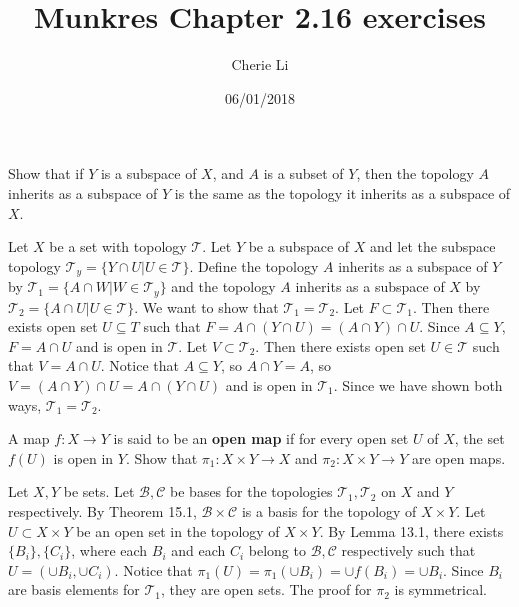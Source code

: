 \documentclass[12pt]{article}
\title{Munkres Chapter 2.16 exercises}
\author{Cherie Li}
\date{06/01/2018}
\newenvironment{problem}[2][Problem]
{
	\begin{trivlist} 
		\item[\hskip \labelsep {\bfseries #1 #2:}]
	}
{
	\end{trivlist}
	}
\newenvironment{solution}[1][Solution]
{
	\begin{trivlist} 
		\item[\hskip \labelsep {\itshape #1:}]
	}
	{
	\end{trivlist}
}
\begin{document}
\maketitle
\newpage
%
%
%
%
\begin{problem}[Exercise]{2.16.1}	
	Show that if $Y$ is a subspace of $X$, and $A$ is a subset of $Y$, then the topology $A$ inherits as a subspace of $Y$ is the same as the topology it inherits as a subspace of $X$. 
\end{problem}
\begin{solution} 
	Let $X$ be a set with topology $\mathcal{T}$. Let $Y$ be a subspace of $X$ and let the subspace topology $\mathcal{T}_y = \lbrace{Y \cap U | U \in \mathcal{T}\rbrace}$. Define the topology $A$ inherits as a subspace of $Y$ by $\mathcal{T}_1 = \lbrace{A \cap W | W \in \mathcal{T}_y\rbrace}$ and the topology $A$ inherits as a subspace of $X$ by $\mathcal{T}_2 = \lbrace{A \cap U | U \in \mathcal{T}\rbrace}$. We want to show that $\mathcal{T}_1 = \mathcal{T}_2$. Let $F \subset \mathcal{T}_1$. Then there exists open set $U \subseteq T$ such that $F = A \cap (Y \cap U) = (A \cap Y) \cap U$. Since $A \subseteq Y$, $F = A \cap U$ and is open in $\mathcal{T}$. Let $V \subset \mathcal{T}_2$. Then there exists open set $U \in \mathcal{T}$ such that $V = A \cap U$. Notice that $A \subseteq Y$, so $A \cap Y = A$, so $V = (A\cap Y)\cap U = A \cap (Y\cap U)$ and is open in $\mathcal{T}_1$. Since we have shown both ways, $\mathcal{T}_1 = \mathcal{T}_2$. 
\end{solution}
\begin{problem}[Exercise]{2.16.4}
A map $f: X \rightarrow Y$ is said to be an \textbf{open map} if for every open set $U$ of $X$, the set $f(U)$ is open in $Y$. Show that $\pi_1: X \times Y \rightarrow X$ and $\pi_2: X \times Y \rightarrow Y$ are open maps.
\end{problem}
\begin{solution}
Let $X, Y$ be sets. Let $\mathcal{B}, \mathcal{C}$ be bases for the topologies $\mathcal{T}_1, \mathcal{T}_2$ on $X$ and $Y$ respectively. By Theorem 15.1, $\mathcal{B} \times \mathcal{C}$ is a basis for the topology of $X \times Y$. Let $U \subset X \times Y$ be an open set in the topology of $X \times Y$. By Lemma 13.1, there exists $\lbrace{B_i\rbrace}, \lbrace{C_i\rbrace}$, where each $B_i$ and each $C_i$ belong to $\mathcal{B, C}$ respectively such that $U = (\cup B_i, \cup C_i)$.  Notice that $\pi_1(U) = \pi_1(\cup B_i) = \cup f(B_i) = \cup B_i$. Since $B_i$ are basis elements for $\mathcal{T}_1$, they are open sets. The proof for $\pi_2$ is symmetrical. 
\end{solution}
\end{document}
